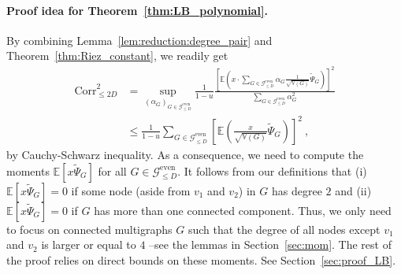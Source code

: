 \documentclass{article}
\begin{document}
\paragraph{Proof idea for Theorem~\ref{thm:LB_polynomial}.} By combining Lemma~\ref{lem:reduction:degree_pair} and Theorem~\ref{thm:Riez_constant}, we readily get 
 \begin{align*}
    \mathrm{Corr}^2_{\leq 2D} &= \sup_{(\alpha_G)_{G\in \mathcal G^{\mathrm{even}}_{\leq D}}} \frac{1}{1-u}\frac{\left[\mathbb  E\left(x \cdot \sum_{G \in \mathcal G^{\mathrm{even}}_{\leq D}} \alpha_G \frac{1}{\sqrt{\mathbb V(G)}}\widetilde{\Psi}_{G}\right) \right]^2}{\sum_{G \in \mathcal G^{\mathrm{even}}_{\leq D}} \alpha^2_G }\\
    &\leq \frac{1}{1-u}\sum_{G \in \mathcal G^{\mathrm{even}}_{\leq D}}\left[\mathbb  E\left( \frac{x}{\sqrt{\mathbb V(G)}}\widetilde{\Psi}_{G}\right) \right]^2\ , 
\end{align*}
by Cauchy-Schwarz inequality. As a consequence, we need to compute the moments  $\mathbb E[x \widetilde{\Psi}_{G}]$ for all $G\in \mathcal  G^{\mathrm{even}}_{\leq D}$. It follows from   our definitions that  (i) $\mathbb E[x \widetilde{\Psi}_{G}] = 0$ if some node (aside from $v_1$ and $v_2$) in $G$ has degree $2$ and (ii) $\mathbb E[x \widetilde{\Psi}_{G}] = 0$ if $G$ has more than one connected component. Thus,  we only need to focus on connected multigraphs $G$ such that the degree of all nodes except $v_1$ and $v_2$ is larger or equal to $4$ --see the lemmas in Section~\ref{sec:mom}.          The rest of the proof relies on direct bounds on these moments. See Section~\ref{sec:proof_LB}.  

         
\end{document}
